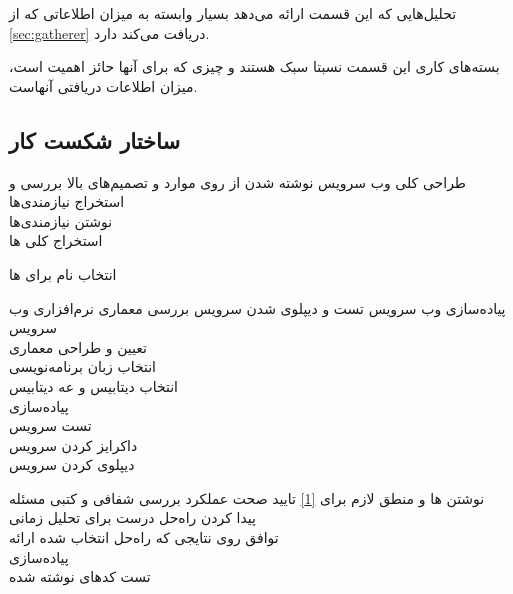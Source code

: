 تحلیل‌هایی که این قسمت ارائه می‌دهد بسیار وابسته به میزان اطلاعاتی که از \ref{sec:gatherer} دریافت می‌کند دارد.

بسته‌های کاری این قسمت نسبتا سبک هستند و چیزی که برای آنها حائز اهمیت است، میزان اطلاعات دریافتی آنهاست.

\subsection{}

\subsection{ساختار شکست کار}
\begin{wbsbox}{}

\begin{wbssub}
{طراحی کلی وب سرویس}
{نوشته شدن  از روی موارد و تصمیم‌های بالا}
بررسی و استخراج نیازمندی‌ها \\
\task
نوشتن نیازمندی‌ها \\
\task
استخراج کلی
ها

\task
انتخاب نام برای ها
\end{wbssub}

\begin{wbssub}
{پیاده‌سازی وب ‌سرویس}
{تست و دیپلوی شدن سرویس}
\task
بررسی معماری نرم‌افزاری وب سرویس \\
\task
تعیین و طراحی معماری \\
\task
انتخاب زبان برنامه‌نویسی \\
\task
انتخاب دیتابیس و  عه دیتابیس \\
\task
پیاده‌سازی \\
\task
تست سرویس \\
\task
داکرایز کردن سرویس \\
\task
دیپلوی کردن سرویس
\end{wbssub}

\begin{wbssub}
{نوشتن ها و منطق لازم برای \ref{1}}
{تایید صحت عملکرد}
\task 
بررسی شفافی و کتبی مسئله \\
\task
پیدا کردن راه‌حل درست برای تحلیل زمانی \\
\task
توافق روی نتایجی که راه‌حل انتخاب شده ارائه \\
\task
پیاده‌سازی \\
\task
تست کد‌‌های نوشته شده
\end{wbssub}


\end{wbsbox}
